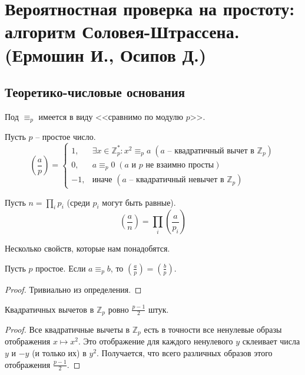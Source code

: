 \newcommand{\divisible}{\mathop{\raisebox{-2pt}{\vdots}}}
\section{Вероятностная проверка на простоту: алгоритм Соловея-Штрассена. (Ермошин И., Осипов Д.)}

\subsection{Теоретико-числовые основания}
Под $\equiv_p$ имеется в виду <<сравнимо по модулю $p$>>.
\begin{definition*} Пусть $p$ -- простое число.
$$\left(\frac{a}{p}\right) = \begin{cases}
1,  & \exists x\in\mathbb{Z}_p^*: x^2\equiv_p a \; (a \text{~-- квадратичный вычет в } \mathbb Z_p)\\
0,  & a\equiv_p0 \; (a \text{ и } p \text{ не взаимно просты})\\
-1, & \text{иначе } (a \text{~-- квадратичный невычет в } \mathbb Z_p)
\end{cases}$$
\end{definition*}

\begin{definition*} Пусть $n = \prod_i p_i$ (среди $p_i$ могут быть равные).
$$\left(\frac{a}{n}\right)=\prod_i \left(\frac{a}{p_i}\right)$$
\end{definition*}

Несколько свойств, которые нам понадобятся.

\begin{lemma} \hypertarget{aequivb}{}
Пусть $p$ простое. Если $a \equiv_p b$, то $\left(\frac{a}{p}\right) = \left(\frac{b}{p}\right)$.
\end{lemma}
\begin{proof}
Тривиально из определения.
\end{proof}

\begin{lemma}\label{qresiduelemma} Квадратичных вычетов в $\mathbb Z_p$ ровно $\frac{p-1}{2}$ штук.
\end{lemma}
\begin{proof}
Все квадратичные вычеты в $\mathbb Z_p$ есть в точности все ненулевые образы отображения $x \mapsto x^2$. Это отображение для каждого ненулевого $y$ склеивает числа $y$ и $-y$ (и только их) в $y^2$. Получается, что всего различных образов этого отображения $\frac{p-1}{2}$.
\end{proof}

